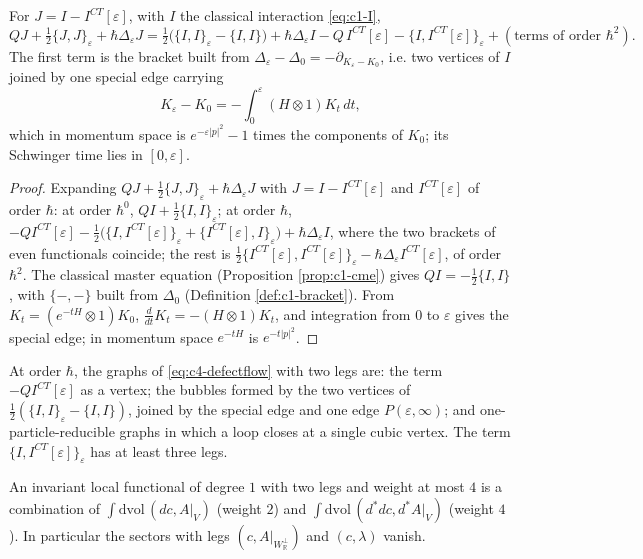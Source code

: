 \begin{proposition}
\label{prop:c4-defect1}
For $J=I-I^{CT}[\varepsilon]$, with $I$ the classical interaction \eqref{eq:c1-I},
\begin{equation}
QJ+\tfrac12\{J,J\}_\varepsilon+\hbar\Delta_\varepsilon J=\tfrac12\big(\{I,I\}_\varepsilon-\{I,I\}\big)+\hbar\Delta_\varepsilon I-Q\,I^{CT}[\varepsilon]-\{I,I^{CT}[\varepsilon]\}_\varepsilon+(\text{terms of order }\hbar^2).
\label{eq:c4-defect1}
\end{equation}
The first term is the bracket built from $\Delta_\varepsilon-\Delta_0=-\partial_{K_\varepsilon-K_0}$, i.e. two vertices of $I$ joined by one special edge carrying
\[
K_\varepsilon-K_0=-\int_0^\varepsilon(H\otimes1)K_t\,dt,
\]
which in momentum space is $e^{-\varepsilon|p|^2}-1$ times the components of $K_0$; its Schwinger time lies in $[0,\varepsilon]$.
\end{proposition}

\begin{proof}
Expanding $QJ+\tfrac12\{J,J\}_\varepsilon+\hbar\Delta_\varepsilon J$ with $J=I-I^{CT}[\varepsilon]$ and $I^{CT}[\varepsilon]$ of order $\hbar$: at order $\hbar^0$, $QI+\tfrac12\{I,I\}_\varepsilon$; at order $\hbar$, $-QI^{CT}[\varepsilon]-\tfrac12\big(\{I,I^{CT}[\varepsilon]\}_\varepsilon+\{I^{CT}[\varepsilon],I\}_\varepsilon\big)+\hbar\Delta_\varepsilon I$, where the two brackets of even functionals coincide; the rest is $\tfrac12\{I^{CT}[\varepsilon],I^{CT}[\varepsilon]\}_\varepsilon-\hbar\Delta_\varepsilon I^{CT}[\varepsilon]$, of order $\hbar^2$. The classical master equation (Proposition \ref{prop:c1-cme}) gives $QI=-\tfrac12\{I,I\}$, with $\{-,-\}$ built from $\Delta_0$ (Definition \ref{def:c1-bracket}). From $K_t=(e^{-tH}\otimes1)K_0$, $\frac{d}{dt}K_t=-(H\otimes1)K_t$, and integration from $0$ to $\varepsilon$ gives the special edge; in momentum space $e^{-tH}$ is $e^{-t|p|^2}$.
\end{proof}

At order $\hbar$, the graphs of \eqref{eq:c4-defectflow} with two legs are: the term $-QI^{CT}[\varepsilon]$ as a vertex; the bubbles formed by the two vertices of $\tfrac12(\{I,I\}_\varepsilon-\{I,I\})$, joined by the special edge and one edge $P(\varepsilon,\infty)$; and one-particle-reducible graphs in which a loop closes at a single cubic vertex. The term $\{I,I^{CT}[\varepsilon]\}_\varepsilon$ has at least three legs.

\begin{lemma}
\label{lem:c4-sectors}
An invariant local functional of degree $1$ with two legs and weight at most $4$ is a combination of $\int\mathrm{dvol}\,(dc,A|_V)$ (weight $2$) and $\int\mathrm{dvol}\,(d^*dc,d^*A|_V)$ (weight $4$). In particular the sectors with legs $(c,A|_{W_{\mathbb R}^\perp})$ and $(c,\lambda)$ vanish.
\end{lemma}

